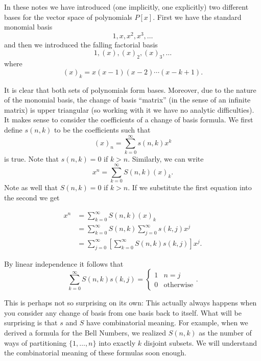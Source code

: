 In these notes we have introduced (one implicitly, one explicitly) two different bases for the vector space of polynomials $P[x]$. First we have the standard monomial basis
\[1, x, x^2, x^3, \dots\]
and then we introduced the falling factorial basis
\[1, (x), (x)_2, (x)_3, \dots\]
where 
\[(x)_k = x(x-1)(x-2)\cdots(x-k+1).\]

It is clear that both sets of polynomials form bases. Moreover, due to the nature of the monomial basis, the change of basis ``matrix'' (in the sense of an infinite matrix) is upper triangular (so working with it we have no analytic difficulties). It makes sense to consider the coefficients of a change of basis formula. We first define $s(n, k)$ to be the coefficients such that 
\[(x)_n = \sum_{k = 0}^{\infty}s(n,k)x^k\] is true. Note that $s(n,k) = 0$ if $k > n$. Similarly, we can write
\[x^n = \sum_{k = 0}^{\infty}S(n,k)(x)_k.\] Note as well that $S(n, k) = 0$ if $k > n$. If we substitute the first equation into the second we get

\begin{align*}
x^n &= \sum_{k = 0}^{\infty}S(n, k)(x)_k \\
&= \sum_{k = 0}^{\infty}S(n, k)\sum_{j = 0}^{\infty}s(k, j)x^j \\
&= \sum_{j = 0}^{\infty}\left[\sum_{k = 0}^{\infty}S(n, k)s(k, j)\right]x^j.
\end{align*}

By linear independence it follows that 
\[\sum_{k = 0}^{\infty}S(n, k)s(k, j) = \begin{cases}1 & n = j \\ 0 & \text{otherwise}\end{cases}.\]

This is perhaps not so surprising on its own: This actually always happens when you consider any change of basis from one basis back to itself. What will be surprising is that $s$ and $S$ have combinatorial meaning. For example, when we derived a formula for the Bell Numbers, we realized $S(n, k)$ as the number of ways of partitioning $\{1, \dots, n\}$ into exactly $k$ disjoint subsets. We will understand the combinatorial meaning of these formulas soon enough.